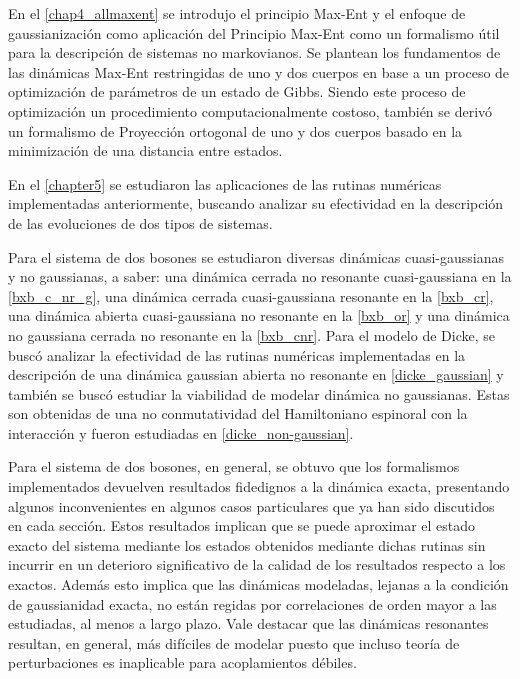 \documentclass{report} %
\numberwithin{equation}{section}
\begin{document}
En el \autoref{chap4_allmaxent} se introdujo el principio Max-Ent y el enfoque de gaussianización como aplicación del Principio Max-Ent como un formalismo útil para la descripción de sistemas no markovianos. Se plantean los fundamentos de las dinámicas Max-Ent restringidas de uno y dos cuerpos en base a un proceso de optimización de parámetros de un estado de Gibbs. Siendo este proceso de optimización un procedimiento computacionalmente costoso, también se derivó un formalismo de Proyección ortogonal de uno y dos cuerpos basado en la minimización de una distancia entre estados. 

En el \autoref{chapter5} se estudiaron las aplicaciones de las rutinas numéricas implementadas anteriormente, buscando analizar su efectividad en la descripción de las evoluciones de dos tipos de sistemas.

Para el sistema de dos bosones se estudiaron diversas dinámicas cuasi-gaussianas y no gaussianas, a saber: una dinámica cerrada no resonante cuasi-gaussiana en la \autoref{bxb_c_nr_g}, una dinámica cerrada cuasi-gaussiana resonante en la \autoref{bxb_cr}, una dinámica abierta cuasi-gaussiana no resonante en la 
\autoref{bxb_or} y una dinámica no gaussiana cerrada no resonante en la
\autoref{bxb_cnr}. Para el modelo de Dicke, se buscó analizar la efectividad de las rutinas numéricas implementadas en la descripción de una dinámica gaussian abierta no resonante en \autoref{dicke_gaussian} y también se buscó estudiar la viabilidad de modelar dinámica no gaussianas. Estas son obtenidas de una no conmutatividad del Hamiltoniano espinoral con la interacción y fueron estudiadas en  \autoref{dicke_non-gaussian}.

Para el sistema de dos bosones, en general, se obtuvo que los formalismos implementados devuelven resultados fidedignos a la dinámica exacta, presentando algunos inconvenientes en algunos casos particulares que ya han sido discutidos en cada sección. Estos resultados implican que se puede aproximar el estado exacto del sistema mediante los estados obtenidos mediante dichas rutinas sin incurrir en un deterioro significativo de la calidad de los resultados respecto a los exactos. Además esto implica que las dinámicas modeladas, lejanas a la condición de gaussianidad exacta, no están regidas por correlaciones de orden mayor a las estudiadas, al menos a largo plazo. Vale destacar que las dinámicas resonantes resultan, en general, más difíciles de modelar puesto que incluso teoría de perturbaciones es inaplicable para acoplamientos débiles.
\end{document}

